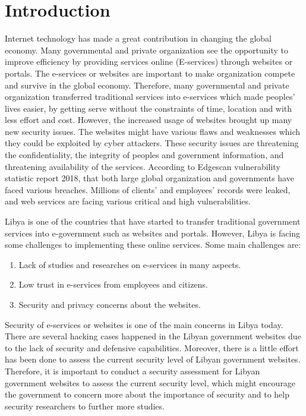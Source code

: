 \documentclass[conference]{IEEEtran}
\begin{document}
\section{Introduction}

Internet technology has made a great contribution in changing the
global economy. Many governmental and private organization see the
opportunity to improve efficiency by providing services online
(E-services) through websites or portals\cite{zhao2010opportunities}\cite{ismailova2017web}.
The e-services or websites are important to make organization compete and survive in
the global economy. Therefore, many governmental and private
organization transferred traditional services into e-services which
made peoples’ lives easier, by getting serve without the constraints of
time, location and with less effort and cost\cite{reddick2012channel}.
However, the increased usage
of websites brought up many new security issues\cite{felderer2016security}. The websites might have
various flaws and weaknesses which they could be exploited by
cyber attackers. These security issues are threatening
the confidentiality, the integrity of peoples and government information,
and threatening availability of the services\cite{al2015security,yusof2013evaluating,kasimin2013using}. According to
Edgescan vulnerability statistic report 2018, that both large global
organization and governments have faced various breaches. Millions of
clients’ and employees’ records were leaked, and web services are
facing various critical and high vulnerabilities.

Libya is one of
the countries that have started to transfer traditional government services
into e-government such as websites and portals. However, Libya is facing some
challenges to implementing these online services. Some main
challenges are\cite{ahmed2011potential}\cite{elaswad2016identity}: 
\begin{enumerate}
\item Lack of studies and researches on e-services in many aspects.
\item Low trust in e-services from employees and citizens.
\item Security and privacy concerns about the websites.
\end{enumerate}

Security of e-services or websites is one of the main
concerns in Libya today\cite{gebba2012government}\cite{elmansori2017factors}. 
There are several
hacking cases happened in the Libyan government
websites due to the lack of security and defensive
capabilities\cite{tehrani2013cyber,yusof2011cyber}. Moreover, there is a little effort has
been done to assess the current security level of
Libyan government websites\cite{ihmouda2013penetration}. Therefore, it
is important to conduct a security assessment for
Libyan government websites to assess the current
security level, which might encourage the
government to concern more about the importance
of security and to help security researchers to further
more studies\cite{forti2017new}. 
\end{document}
